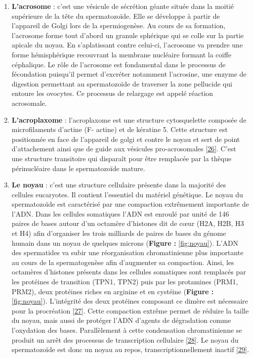 \documentclass[12pt,a4paper,twoside]{ugathesis}
\theoremstyle{definition}
\theoremstyle{definition}
\theoremstyle{definition}
\theoremstyle{remark}
\begin{document}
\begin{enumerate}
\def\labelenumi{\arabic{enumi}.}
\item
  \textbf{L'acrosome} : c'est une vésicule de sécrétion géante située
  dans la moitié supérieure de la tête du spermatozoïde. Elle se
  développe à partir de l'appareil de Golgi lors de la spermiogenèse. Au
  cours de sa formation, l'acrosome forme tout d'abord un granule
  sphérique qui se colle sur la partie apicale du noyau. En
  s'aplatissant contre celui-ci, l'acrosome va prendre une forme
  hémisphérique recouvrant la membrane nucléaire formant la coiffe
  céphalique. Le rôle de l'acrosome est fondamental dans le processus de
  fécondation puisqu'il permet d'excréter notamment l'acrosine, une
  enzyme de digestion permettant au spermatozoïde de traverser la zone
  pellucide qui entoure les ovocytes. Ce processus de relargage est
  appelé réaction acrosomale.
\item
  \textbf{L'acroplaxome} : l'acroplaxome est une structure cytosquelette
  composée de microfilaments d'actine (F- actine) et de kératine 5.
  Cette structure est positionnée en face de l'appareil de golgi et
  contre le noyau et sert de point d'attachement ainsi que de guide aux
  vésicules pro-acrosomales
  {[}\protect\hyperlink{ref-Kierszenbaum2004}{26}{]}. C'est une
  structure transitoire qui disparaît pour être remplacée par la thèque
  périnucléaire dans le spermatozoïde mature.
\item
  \textbf{Le noyau} : c'est une structure cellulaire présente dans la
  majorité des cellules eucaryotes. Il contient l'essentiel du matériel
  génétique. Le noyau du spermatozoïde est caractérisé par une
  compaction extrêmement importante de l'ADN. Dans les cellules
  somatiques l'ADN est enroulé par unité de 146 paires de bases autour
  d'un octamère d'histones dit de cœur (H2A, H2B, H3 et H4) afin
  d'organiser les trois milliards de paires de bases du génome humain
  dans un noyau de quelques microns (\textbf{Figure : }\ref{fig:noyau}).
  L'ADN des spermatides va subir une réorganisation chromatinienne plus
  importante au cours de la spermatogenèse afin d'augmenter sa
  compaction. Ainsi, les octamères d'histones présents dans les cellules
  somatiques sont remplacés par les protéines de transition (TPN1, TPN2)
  puis par les protamines (PRM1, PRM2), deux protéines riches en
  arginine et en cystéine (\textbf{Figure : }\ref{fig:noyau}).
  L'intégrité des deux protéines composant ce dimère est nécessaire pour
  la procréation {[}\protect\hyperlink{ref-Cho2001}{27}{]}. Cette
  compaction extrême permet de réduire la taille du noyau, mais aussi de
  protéger l'ADN d'agents de dégradation comme l'oxydation des bases.
  Parallèlement à cette condensation chromatinienne se produit un arrêt
  des processus de transcription cellulaire
  {[}\protect\hyperlink{ref-Kierszenbaum1978}{28}{]}. Le noyau du
  spermatozoïde est donc un noyau au repos, transcriptionnellement
  inactif {[}\protect\hyperlink{ref-Ward1994}{29}{]}.
\end{enumerate}
\end{document}
